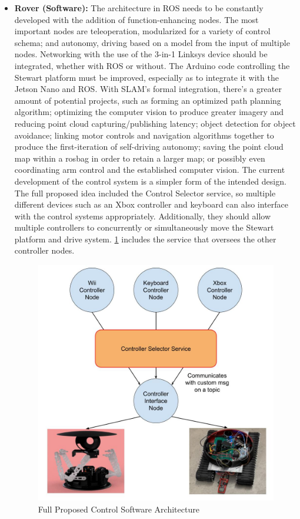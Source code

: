 \documentclass[a4paper, 10pt]{article}
\begin{document}
\begin{itemize}
		\item \textbf{Rover (Software):} The architecture in ROS needs to be constantly developed with the addition of function-enhancing nodes. The most important nodes are teleoperation, modularized for a variety of control schema; and autonomy, driving based on a model from the input of multiple nodes. Networking with the use of the 3-in-1 Linksys device should be integrated, whether with ROS or without. The Arduino code controlling the Stewart platform must be improved, especially as to integrate it with the Jetson Nano and ROS. With SLAM's formal integration, there's a greater amount of potential projects, such as forming an optimized path planning algorithm; optimizing the computer vision to produce greater imagery and reducing point cloud capturing/publishing latency; object detection for object avoidance; linking motor controls and navigation algorithms together to produce the first-iteration of self-driving autonomy; saving the point cloud map within a rosbag in order to retain a larger map; or possibly even coordinating arm control and the established computer vision. 
		The current development of the control system is a simpler form of the intended design. The full proposed idea included the Control Selector service, so multiple different devices such as an Xbox controller and keyboard can also interface with the control systems appropriately. Additionally, they should allow multiple controllers to concurrently or simultaneously move the Stewart platform and drive system. \ref{full_control_schema} includes the service that oversees the other controller nodes.
		
		\begin{figure} [!h]
			\centering
			\includegraphics[scale=0.6]{Photos/Control Software Architecture Future Goals.jpg}
			\caption{Full Proposed Control Software Architecture}
			\label{full_control_schema}
		\end{figure} 
	\end{itemize}
	
\end{document}
